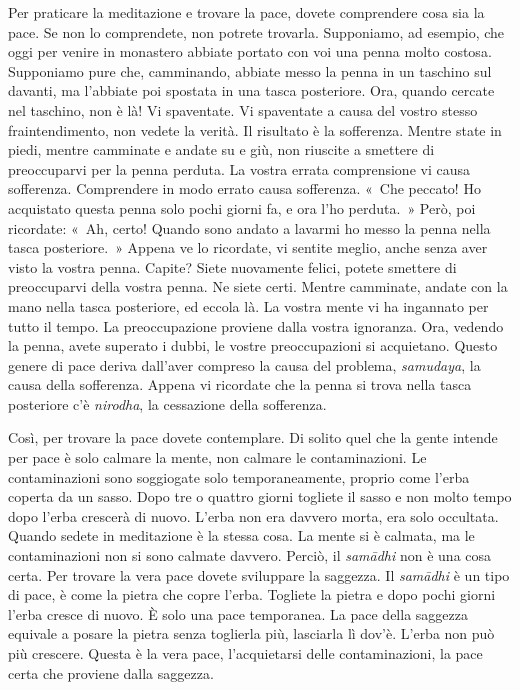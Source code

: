 Per praticare la meditazione e trovare la pace, dovete comprendere cosa
sia la pace. Se non lo comprendete, non potrete trovarla. Supponiamo, ad
esempio, che oggi per venire in monastero abbiate portato con voi una
penna molto costosa. Supponiamo pure che, camminando, abbiate messo la
penna in un taschino sul davanti, ma l'abbiate poi spostata in una tasca
posteriore. Ora, quando cercate nel taschino, non è là! Vi spaventate.
Vi spaventate a causa del vostro stesso fraintendimento, non vedete la
verità. Il risultato è la sofferenza. Mentre state in piedi, mentre
camminate e andate su e giù, non riuscite a smettere di preoccuparvi per
la penna perduta. La vostra errata comprensione vi causa sofferenza.
Comprendere in modo errato causa sofferenza. «~Che peccato! Ho
acquistato questa penna solo pochi giorni fa, e ora l'ho perduta.~»
Però, poi ricordate: «~Ah, certo! Quando sono andato a lavarmi ho messo
la penna nella tasca posteriore.~» Appena ve lo ricordate, vi sentite
meglio, anche senza aver visto la vostra penna. Capite? Siete nuovamente
felici, potete smettere di preoccuparvi della vostra penna. Ne siete
certi. Mentre camminate, andate con la mano nella tasca posteriore, ed
eccola là. La vostra mente vi ha ingannato per tutto il tempo. La
preoccupazione proviene dalla vostra ignoranza. Ora, vedendo la penna,
avete superato i dubbi, le vostre preoccupazioni si acquietano. Questo
genere di pace deriva dall'aver compreso la causa del problema,
\emph{samudaya}, la causa della sofferenza. Appena vi ricordate che la
penna si trova nella tasca posteriore c'è \emph{nirodha}, la cessazione
della sofferenza.

Così, per trovare la pace dovete contemplare. Di solito quel che la
gente intende per pace è solo calmare la mente, non calmare le
contaminazioni. Le contaminazioni sono soggiogate solo temporaneamente,
proprio come l'erba coperta da un sasso. Dopo tre o quattro giorni
togliete il sasso e non molto tempo dopo l'erba crescerà di nuovo.
L'erba non era davvero morta, era solo occultata. Quando sedete in
meditazione è la stessa cosa. La mente si è calmata, ma le
contaminazioni non si sono calmate davvero. Perciò, il \emph{samādhi}
non è una cosa certa. Per trovare la vera pace dovete sviluppare la
saggezza. Il \emph{samādhi} è un tipo di pace, è come la pietra che
copre l'erba. Togliete la pietra e dopo pochi giorni l'erba cresce di
nuovo. È solo una pace temporanea. La pace della saggezza equivale a
posare la pietra senza toglierla più, lasciarla lì dov'è. L'erba non può
più crescere. Questa è la vera pace, l'acquietarsi delle contaminazioni,
la pace certa che proviene dalla saggezza.

